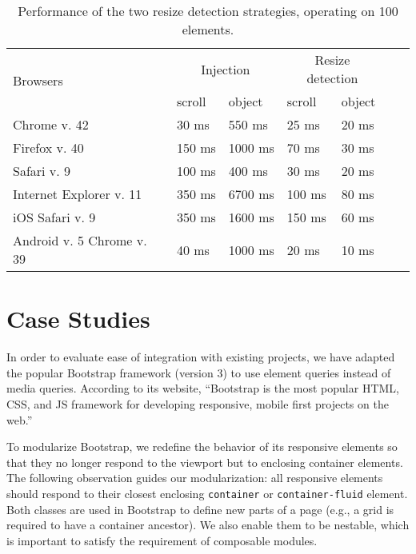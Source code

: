 \documentclass[sigplan,9pt]{acmart}
\newcommand{\code}[1]{\texttt{#1}}
\begin{document}
    \begin{table}[ht]\center
      \small
      \begin{tabular}[t]{ l l l l l l l }
        \multirow{2}{*}{Browsers} & \multicolumn{2}{c}{Injection} & \multicolumn{2}{c}{Resize detection} \\
        & scroll & object & scroll & object \\
        \hline
        Chrome v. 42                & 30 ms   & 550 ms    & 25 ms    & 20 ms  \\
        Firefox v. 40               & 150 ms  & 1000 ms   & 70 ms    & 30 ms  \\
        Safari v. 9                 & 100 ms  & 400 ms    & 30 ms    & 20 ms  \\
        Internet Explorer v. 11     & 350 ms  & 6700 ms   & 100 ms   & 80 ms  \\
        iOS Safari v. 9             & 350 ms  & 1600 ms   & 150 ms   & 60 ms  \\
        Android v. 5 Chrome v. 39   & 40 ms   & 1000 ms  & 20 ms     & 10 ms  \\
      \end{tabular}
      \vspace{.5cm}
      \caption{Performance of the two resize detection strategies, operating on 100 elements.}
      \label{table:erd-layout-engines}
    \end{table}

\section{Case Studies}\label{sec:case-studies}
    In order to evaluate ease of integration with existing projects, we have adapted the popular Bootstrap framework (version 3) to use element queries instead of media queries.
    According to its website, ``Bootstrap is the most popular HTML, CSS, and JS framework for developing responsive, mobile first projects on the web.''~\cite{bootstrap}

    To modularize Bootstrap, we redefine the behavior of its responsive elements so that they no longer respond to the viewport but to enclosing container elements.
    The following observation guides our modularization: all responsive elements should respond to their closest enclosing \code{container} or \code{container-fluid} element.
    Both classes are used in Bootstrap to define new parts of a page (e.g., a grid is required to have a container ancestor).
    We also enable them to be nestable, which is important to satisfy the requirement of composable modules.
\end{document}
